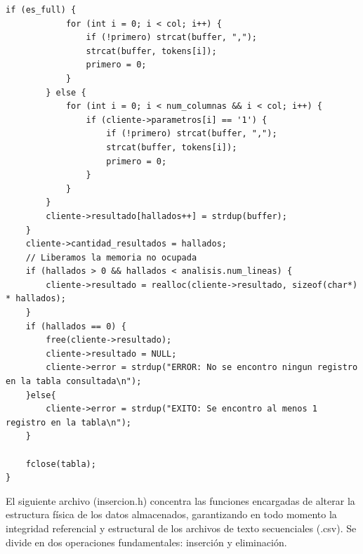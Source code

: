 \documentclass[12pt]{article}
\begin{document}
\begin{lstlisting}[style=estiloC ,title={Código 2. Servidor TCP (consulta.c)}]
        if (es_full) {
            for (int i = 0; i < col; i++) {
                if (!primero) strcat(buffer, ",");
                strcat(buffer, tokens[i]);
                primero = 0;
            }
        } else {
            for (int i = 0; i < num_columnas && i < col; i++) {
                if (cliente->parametros[i] == '1') {
                    if (!primero) strcat(buffer, ",");
                    strcat(buffer, tokens[i]);
                    primero = 0;
                }
            }
        }
        cliente->resultado[hallados++] = strdup(buffer);
    }
    cliente->cantidad_resultados = hallados;
    // Liberamos la memoria no ocupada
    if (hallados > 0 && hallados < analisis.num_lineas) {
        cliente->resultado = realloc(cliente->resultado, sizeof(char*) * hallados);
    }
    if (hallados == 0) {
        free(cliente->resultado);
        cliente->resultado = NULL;
        cliente->error = strdup("ERROR: No se encontro ningun registro en la tabla consultada\n");
    }else{
        cliente->error = strdup("EXITO: Se encontro al menos 1 registro en la tabla\n");
    }

    fclose(tabla);
}
\end{lstlisting}

El siguiente archivo (insercion.h) concentra las funciones encargadas de alterar la estructura física de los datos almacenados, garantizando en todo momento la integridad referencial y estructural de los archivos de texto secuenciales (.csv). Se divide en dos operaciones fundamentales: inserción y eliminación.
\end{document}

